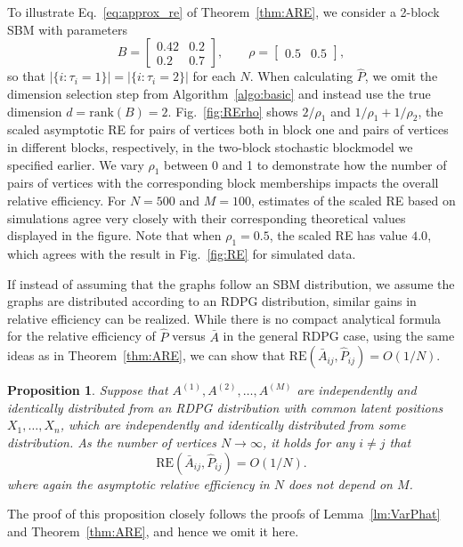 \documentclass[10pt,letterpaper]{article}
\newtheorem{proposition}[fact]{Proposition}
\renewcommand{\hat}{\widehat}
\begin{document}
To illustrate Eq.~\ref{eq:approx_re} of Theorem~\ref{thm:ARE}, we consider a 2-block SBM with parameters
\begin{equation}
B = \begin{bmatrix}
0.42 & 0.2 \\
0.2 & 0.7
\end{bmatrix}
,\qquad \rho = \begin{bmatrix}
0.5 & 0.5
\end{bmatrix},
\label{eq:sim_setting}
\end{equation}
so that $|\{i:\tau_i=1\}|=|\{i:\tau_i=2\}|$ for each $N$.
When calculating $\hat{P}$, we omit the dimension selection step from Algorithm~\ref{algo:basic} and instead use the true dimension $d = \mathrm{rank}(B) = 2$.
Fig.~\ref{fig:RErho} shows $2/\rho_1$ and $1/\rho_1+1/\rho_2$, the scaled asymptotic RE for pairs of vertices both in block one and pairs of vertices in different blocks, respectively, in the two-block stochastic blockmodel we specified earlier.
We vary $\rho_1$ between 0 and 1 to demonstrate how the number of pairs of vertices with the corresponding block memberships impacts the overall relative efficiency.
For $N=500$ and $M=100$, estimates of the scaled RE based on simulations agree very closely with their corresponding theoretical values displayed in the figure. Note that when $\rho_1 = 0.5$, the scaled RE has value $4.0$, which agrees with the result in Fig.~\ref{fig:RE} for simulated data.



If instead of assuming that the graphs follow an SBM distribution, we assume the graphs are distributed according to an RDPG distribution, similar gains in relative efficiency can be realized.
While there is no compact analytical formula for the relative efficiency of $\hat{P}$ versus $\bar{A}$ in the general RDPG case, using the same ideas as in Theorem~\ref{thm:ARE}, we can show that $\mathrm{RE}(\bar{A}_{ij},\hat{P}_{ij}) = O(1/N)$.

\begin{proposition}
Suppose that $A^{(1)},A^{(2)},\dotsc,A^{(M)}$ are independently and identically distributed from an RDPG distribution with common latent positions $X_1,\dotsc,X_n$, which are independently and identically distributed from some distribution.
As the number of vertices $N\to\infty$, it holds for any $i\neq j$ that 
\[
    \mathrm{RE}(\bar{A}_{ij},\hat{P}_{ij}) = O(1/N).
\]
where again the asymptotic relative efficiency in $N$ does not depend on $M$.
\end{proposition}
The proof of this proposition closely follows the proofs of Lemma~\ref{lm:VarPhat} and Theorem~\ref{thm:ARE}, and hence we omit it here.
\end{document}
